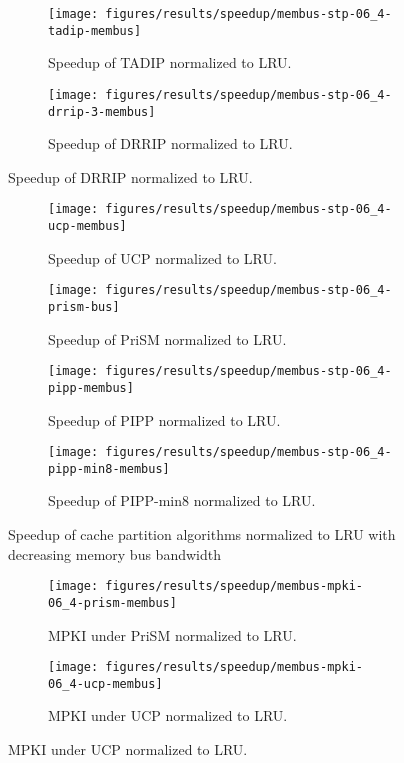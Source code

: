 \begin{figure}[!htb]
    \centering
    \begin{subfigure}[b]{0.5\textwidth}
        \texttt{[image: figures/results/speedup/membus-stp-06\_4-tadip-membus]}
        \caption{Speedup of TADIP normalized to LRU.}
        \label{fig:results:bus:tadip}
    \end{subfigure}%
    \begin{subfigure}[b]{0.5\textwidth}
        \texttt{[image: figures/results/speedup/membus-stp-06\_4-drrip-3-membus]}
        \caption{Speedup of DRRIP normalized to LRU.}
        \label{fig:results:bus:drrip}
    \end{subfigure}
\end{figure}
\clearpage
\begin{figure}[!htb]
    \ContinuedFloat
    \begin{subfigure}[b]{0.5\textwidth}
        \texttt{[image: figures/results/speedup/membus-stp-06\_4-ucp-membus]}
        \caption{Speedup of UCP normalized to LRU.}
        \label{fig:results:bus:ucp}
    \end{subfigure}%
    \begin{subfigure}[b]{0.5\textwidth}
        \texttt{[image: figures/results/speedup/membus-stp-06\_4-prism-bus]}
        \caption{Speedup of PriSM normalized to LRU.}
        \label{fig:results:bus:prism}
    \end{subfigure}
    \begin{subfigure}[b]{0.5\textwidth}
        \texttt{[image: figures/results/speedup/membus-stp-06\_4-pipp-membus]}
        \caption{Speedup of PIPP normalized to LRU.}
        \label{fig:results:bus:pipp}
    \end{subfigure}%
    \begin{subfigure}[b]{0.5\textwidth}
        \texttt{[image: figures/results/speedup/membus-stp-06\_4-pipp-min8-membus]}
        \caption{Speedup of PIPP-min8 normalized to LRU.}
        \label{fig:results:bus:pipp-min8}
    \end{subfigure}
    \caption{Speedup of cache partition algorithms normalized to LRU with decreasing memory bus bandwidth}
    \label{fig:results:bus}
\end{figure}

\begin{figure}[!htb]
    \centering
    \begin{subfigure}[b]{0.5\textwidth}
        \texttt{[image: figures/results/speedup/membus-mpki-06\_4-prism-membus]}
        \caption{MPKI under PriSM normalized to LRU.}
        \label{fig:results:membus:mpki-prism}
    \end{subfigure}%
    \begin{subfigure}[b]{0.5\textwidth}
        \texttt{[image: figures/results/speedup/membus-mpki-06\_4-ucp-membus]}
        \caption{MPKI under UCP normalized to LRU.}
        \label{fig:results:membus:mpki-ucp}
    \end{subfigure}
\end{figure}

